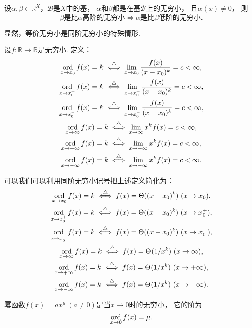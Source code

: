 \begin{proposition}
设\(\alpha,\beta\in\mathbb{R}^X\)，\(\mathcal{B}\)是\(X\)中的基，
\(\alpha\)和\(\beta\)都是在基\(\mathcal{B}\)上的无穷小，
且\(\alpha(x)\neq0\)，
则\[
	\text{\(\beta\)是比\(\alpha\)高阶的无穷小}
	\iff
	\text{\(\alpha\)是比\(\beta\)低阶的无穷小}.
\]
\end{proposition}

\begin{remark}
显然，等价无穷小是同阶无穷小的特殊情形.
\end{remark}

\begin{definition}
设\(f\colon\mathbb{R}\to\mathbb{R}\)是无穷小.
定义：\begin{gather*}
	\operatorname*{ord}_{x \to x_0} f(x) = k
	\overset{\triangle}{\iff}
	\lim_{x \to x_0} \frac{f(x)}{(x-x_0)^k} = c < \infty, \\
	\operatorname*{ord}_{x \to x_0^+} f(x) = k
	\overset{\triangle}{\iff}
	\lim_{x \to x_0^+} \frac{f(x)}{(x-x_0)^k} = c < \infty, \\
	\operatorname*{ord}_{x \to x_0^-} f(x) = k
	\overset{\triangle}{\iff}
	\lim_{x \to x_0^-} \frac{f(x)}{(x-x_0)^k} = c < \infty, \\
	\operatorname*{ord}_{x \to \infty} f(x) = k
	\overset{\triangle}{\iff}
	\lim_{x \to \infty} x^k f(x) = c < \infty, \\
	\operatorname*{ord}_{x \to +\infty} f(x) = k
	\overset{\triangle}{\iff}
	\lim_{x \to +\infty} x^k f(x) = c < \infty, \\
	\operatorname*{ord}_{x \to -\infty} f(x) = k
	\overset{\triangle}{\iff}
	\lim_{x \to -\infty} x^k f(x) = c < \infty.
\end{gather*}
\end{definition}
\begin{remark}
可以我们可以利用同阶无穷小记号把上述定义简化为：\begin{gather*}
	\operatorname*{ord}_{x \to x_0} f(x) = k
	\overset{\triangle}{\iff}
	f(x) = \Theta((x-x_0)^k)\ (x \to x_0), \\
	\operatorname*{ord}_{x \to x_0^+} f(x) = k
	\overset{\triangle}{\iff}
	f(x) = \Theta((x-x_0)^k)\ (x \to x_0^+), \\
	\operatorname*{ord}_{x \to x_0^-} f(x) = k
	\overset{\triangle}{\iff}
	f(x) = \Theta((x-x_0)^k)\ (x \to x_0^-), \\
	\operatorname*{ord}_{x \to \infty} f(x) = k
	\overset{\triangle}{\iff}
	f(x) = \Theta(1/x^k)\ (x \to \infty), \\
	\operatorname*{ord}_{x \to +\infty} f(x) = k
	\overset{\triangle}{\iff}
	f(x) = \Theta(1/x^k)\ (x \to +\infty), \\
	\operatorname*{ord}_{x \to -\infty} f(x) = k
	\overset{\triangle}{\iff}
	f(x) = \Theta(1/x^k)\ (x \to -\infty).
\end{gather*}
\end{remark}
\begin{example}
幂函数\(f(x) = a x^\mu\ (a\neq0)\)是当\(x\to0\)时的无穷小，
它的阶为\[
	\operatorname*{ord}_{x\to0} f(x) = \mu.
\]
\end{example}

